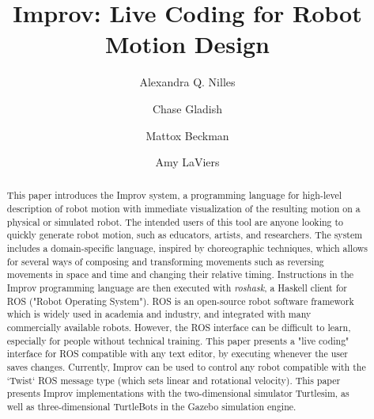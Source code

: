 \documentclass[sigconf]{acmart}
\begin{document}
\title{Improv: Live Coding for Robot Motion Design}


\author{Alexandra Q. Nilles}

\author{Chase Gladish}

\author{Mattox Beckman}

\author{Amy LaViers}

\renewcommand{\shortauthors}{A. Nilles et al.}

\begin{abstract}
This paper introduces the Improv system, a programming language for high-level
description of robot motion with immediate visualization of the
resulting motion on a physical or simulated robot. The intended users of this
tool are anyone looking to quickly generate robot motion, such as educators,
artists, and researchers. The system includes a domain-specific language,
inspired by choreographic techniques, which allows for several ways of composing
and transforming movements such as reversing movements in space and time and
changing their relative timing. Instructions in the Improv programming language
are then executed with \emph{roshask}, a Haskell client for ROS ("Robot Operating
System"). ROS is an open-source robot software framework which is widely used in
academia and industry, and integrated with many commercially available robots.
However, the ROS interface can be difficult to learn, especially for people
without technical training. This paper presents a "live coding" interface for
ROS compatible with any text editor, by executing whenever the user saves
changes. Currently, Improv can be used to control any robot compatible with the
`Twist` ROS message type (which sets linear and rotational velocity). This paper
presents Improv implementations with the two-dimensional simulator
Turtlesim, as well as three-dimensional TurtleBots in the Gazebo simulation
engine.
\end{abstract}
\end{document}
